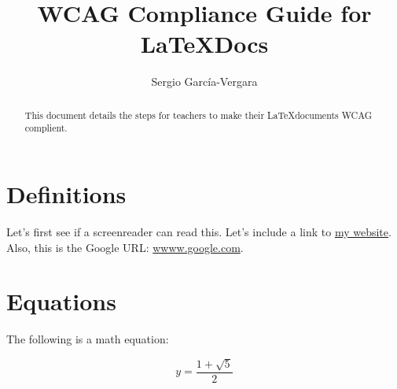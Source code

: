 \documentclass{llncs}
\begin{document}



\title{WCAG Compliance Guide for \LaTeX Docs }

\author{Sergio Garc\'{i}a-Vergara}


\maketitle




\begin{abstract}
  This document details the steps for teachers to make their \LaTeX documents
  WCAG complient.


\end{abstract}



\section{Definitions}

Let's first see if a screenreader can read this. Let's include a link to
\href{www.sergiogarciavergara.com}{my website}. Also, this is the Google URL:
\url{wwww.google.com}.




\section{Equations}

The following is a math equation:

\begin{equation}
  y = \frac{1 + \sqrt{5}}{2}
\end{equation}








\end{document}
